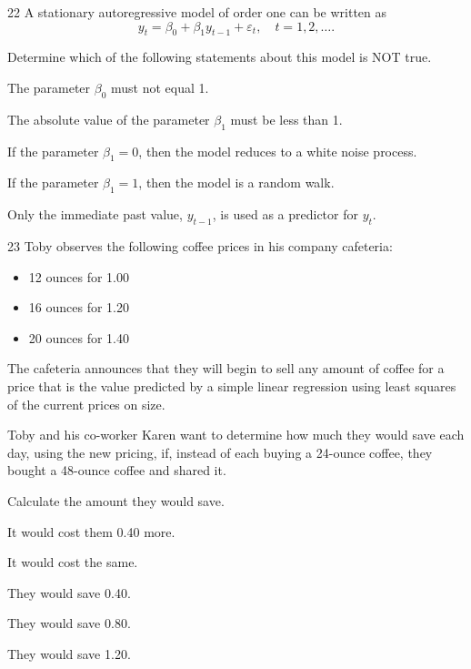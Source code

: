 \begin{question}{22}
A stationary autoregressive model of order one can be written as
\[ y_t = \beta_0 + \beta_1 y_{t-1} + \varepsilon_t, \quad t = 1, 2, \ldots. \]

Determine which of the following statements about this model is NOT true.

\begin{choices}
\item The parameter $\beta_0$ must not equal 1.
\item The absolute value of the parameter $\beta_1$ must be less than 1.
\item If the parameter $\beta_1 = 0$, then the model reduces to a white noise process.
\item If the parameter $\beta_1 = 1$, then the model is a random walk.
\item Only the immediate past value, $y_{t-1}$, is used as a predictor for $y_t$.
\end{choices}
\end{question}

\begin{question}{23}
Toby observes the following coffee prices in his company cafeteria:
\begin{itemize}
\item 12 ounces for 1.00
\item 16 ounces for 1.20
\item 20 ounces for 1.40
\end{itemize}
The cafeteria announces that they will begin to sell any amount of coffee for a price that is the value predicted by a simple linear regression using least squares of the current prices on size.

Toby and his co-worker Karen want to determine how much they would save each day, using the new pricing, if, instead of each buying a 24-ounce coffee, they bought a 48-ounce coffee and shared it.

Calculate the amount they would save.

\begin{choices}
\item It would cost them 0.40 more.
\item It would cost the same.
\item They would save 0.40.
\item They would save 0.80.
\item They would save 1.20.
\end{choices}
\end{question}

